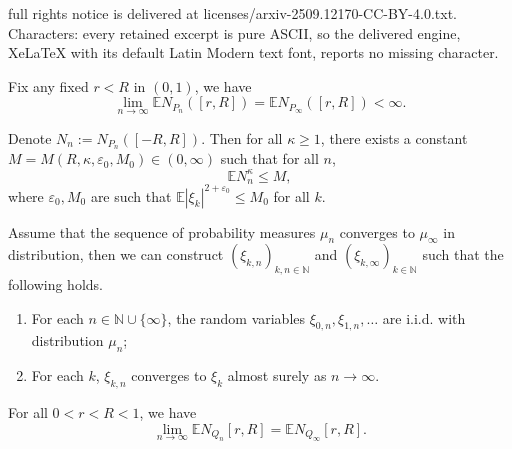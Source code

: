 \documentclass[10pt,a4paper]{amsart}
\newcommand\E{{\mathbb{E}}}
\newcommand\N{{\mathbb{N}}}
\begin{document}
full rights notice is delivered at licenses/arxiv-2509.12170-CC-BY-4.0.txt. Characters: every retained excerpt is pure ASCII, so the delivered engine, XeLaTeX with its default Latin Modern text font, reports no missing character.
\begin{lemma}\label{lem:ConvFarFrom01}
    Fix any fixed $r<R$ in $ (0, 1)$, we have
    $$\lim_{n \rightarrow \infty} \E N_{P_n}([r, R]) = \E N_{P_{\infty}}([r, R]) < \infty.$$
\end{lemma}

\begin{lemma}\label{lem:momentsOfNumRoots}
	Denote $N_n := N_{P_n}([-R, R])$. Then for all $\kappa \ge 1$, there exists a constant $M = M(R, \kappa, \varepsilon_0, M_0) \in (0,\infty)$ such that for all $n$, $$ \E N_n^{\kappa} \le M,$$
	where $\varepsilon_0, M_0$ are such that $\E|\xi_k|^{2 + \varepsilon_0} \le M_0$ for all $k$. 
\end{lemma}

\begin{lemma}\label{lem:SkorokhodConstruction}
	Assume that the sequence of probability measures $\mu_{n}$ converges to $\mu_\infty$ in distribution, then we can construct $(\xi_{k, n})_{k, n\in \N}$ and $(\xi_{k, \infty})_{k\in \N}$ such that the following holds.
	\begin{enumerate}
		\item For each $n\in \N\cup \{\infty\}$, the random variables $\xi_{0, n}, \xi_{1, n}, \dots$ are i.i.d. with distribution $\mu_{n}$;
		\item For each $k$, $\xi_{k, n}$ converges to $\xi_k$ almost surely as $n\to\infty$.
	\end{enumerate}
\end{lemma}

\begin{lemma}\label{lem:ConvFarFrom01Cont}
For all $0 < r < R < 1$, we have $$\lim_{n \rightarrow \infty}\E N_{Q_{n}}[r, R] = \E N_{Q_\infty}[r, R].$$
\end{lemma}
\end{document}

